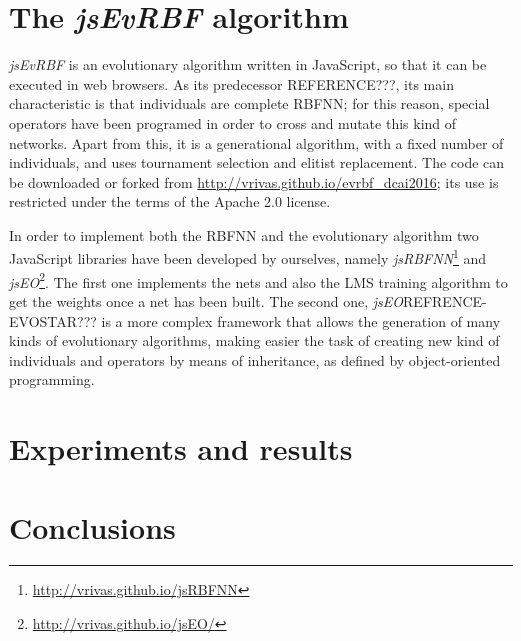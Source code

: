 \documentclass{llncs}
\begin{document}
\section{The {\em jsEvRBF} algorithm}
\label{sec:algorithm}
{\em jsEvRBF} is an evolutionary algorithm written in JavaScript, so that it can be executed in web browsers.  As its predecessor REFERENCE???, its main characteristic is that individuals are complete RBFNN; for this reason, special operators have been programed in order to cross and mutate this kind of networks. Apart from this, it is a generational algorithm, with a fixed number of individuals, and uses tournament selection and elitist replacement. The code can be downloaded or forked from \url{ http://vrivas.github.io/evrbf_dcai2016}; its use is restricted under the terms of the Apache 2.0 license.

In order to implement both the RBFNN and the evolutionary algorithm two JavaScript libraries have been developed by ourselves, namely {\em jsRBFNN}\footnote{\url{http://vrivas.github.io/jsRBFNN}} and {\em jsEO}\footnote{\url{http://vrivas.github.io/jsEO/}}. The first one implements the nets and also the LMS training algorithm to get the weights once a net has been built. The second one, {\em jsEO}REFRENCE-EVOSTAR??? is a more complex framework that allows the generation of many kinds of evolutionary algorithms, making easier the task of creating new kind of individuals and operators by means of inheritance, as defined by object-oriented programming.





\section{Experiments and results}
\label{sec:experiments}
\section{Conclusions}
\label{sec:conclusions}
\end{document}
